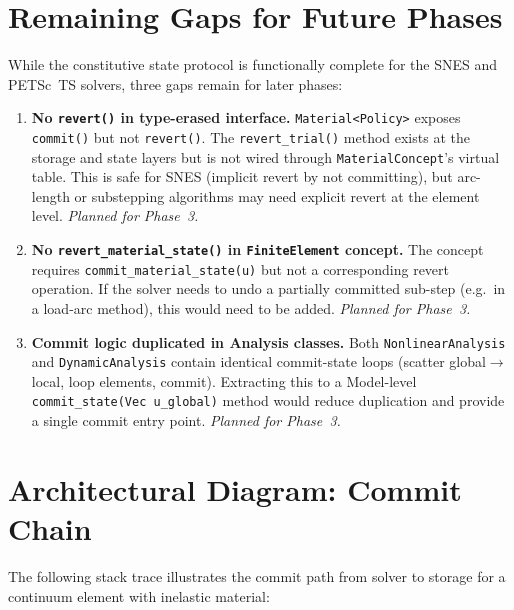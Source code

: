 \section{Remaining Gaps for Future Phases}
\label{sec:phase1-gaps}

While the constitutive state protocol is functionally complete for the
SNES and PETSc~TS solvers, three gaps remain for later phases:

\begin{enumerate}
  \item \textbf{No \texttt{revert()} in type-erased interface.}
        \texttt{Material<Policy>} exposes \texttt{commit()} but not
        \texttt{revert()}.  The \texttt{revert\_trial()} method exists
        at the storage and state layers but is not wired through
        \texttt{MaterialConcept}'s virtual table.
        This is safe for SNES (implicit revert by not committing),
        but arc-length or substepping algorithms may need explicit
        revert at the element level.
        \emph{Planned for Phase~3.}

  \item \textbf{No \texttt{revert\_material\_state()} in
        \texttt{FiniteElement} concept.}
        The concept requires \texttt{commit\_material\_state(u)} but
        not a corresponding revert operation.  If the solver needs
        to undo a partially committed sub-step (e.g.\ in a load-arc
        method), this would need to be added.
        \emph{Planned for Phase~3.}

  \item \textbf{Commit logic duplicated in Analysis classes.}
        Both \texttt{NonlinearAnalysis} and \texttt{DynamicAnalysis}
        contain identical commit-state loops (scatter global$\to$local,
        loop elements, commit).  Extracting this to a Model-level
        \texttt{commit\_state(Vec u\_global)} method would reduce
        duplication and provide a single commit entry point.
        \emph{Planned for Phase~3.}
\end{enumerate}


\section{Architectural Diagram: Commit Chain}
\label{sec:phase1-architecture-diagram}

The following stack trace illustrates the commit path from solver
to storage for a continuum element with inelastic material:

